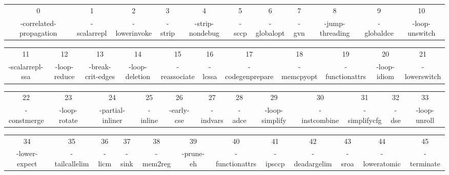 \begin{table*}[!t]
\caption{LLVM Transform Passes.}
\scriptsize
\centering
\begin{tabular}{ccccccccccc}
\hline
0 & 1 & 2 & 3 & 4 & 5 & 6 & 7 & 8 & 9 & 10 \\
-correlated-propagation & -scalarrepl & -lowerinvoke & -strip & -strip-nondebug & -sccp & -globalopt & -gvn & -jump-threading & -globaldce & -loop-unswitch \\
\end{tabular}
\begin{tabular}{ccccccccccc}
\hline
11 & 12 & 13 & 14 & 15 & 16 & 17 & 18 & 19 & 20 & 21 \\
-scalarrepl-ssa & -loop-reduce & -break-crit-edges & -loop-deletion & -reassociate & -lcssa & -codegenprepare & -memcpyopt & -functionattrs & -loop-idiom & -lowerswitch \\
\end{tabular}
\begin{tabular}{cccccccccccc}
\hline
22 & 23 & 24 & 25 & 26 & 27 & 28 & 29 & 30 & 31 & 32 & 33 \\
-constmerge & -loop-rotate & -partial-inliner & -inline & -early-cse & -indvars & -adce & -loop-simplify & -instcombine & -simplifycfg & -dse & -loop-unroll \\
\end{tabular}
\begin{tabular}{cccccccccccc}
\hline
34 & 35 & 36 & 37 & 38 & 39 & 40 & 41 & 42 & 43 & 44 & 45 \\
-lower-expect & -tailcallelim & -licm & -sink & -mem2reg & -prune-eh & -functionattrs & -ipsccp & -deadargelim & -sroa & -loweratomic & -terminate \\
\hline
\end{tabular}
\label{tab:passes}

\end{table*}